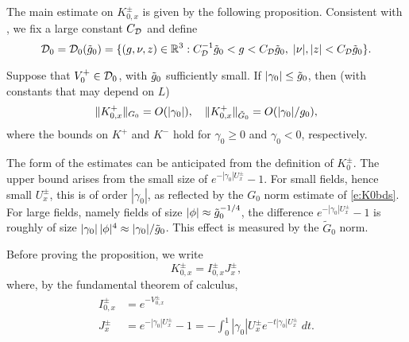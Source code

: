 
The main estimate on $K^\pm_{0,x}$ is given by the following proposition.
Consistent with \cite[\eqref{IE-e:DV1-bis}]{BS-rg-IE}, we
fix a large constant $C_{\mathcal{D}}$ and define
\begin{equation}
\label{e:DV0}
    \mathcal{D}_0 = \mathcal{D}_0(\tilde{g}_0) = \{(g,\nu,z) \in {\mathbb R}^3 : C_{\mathcal{D}}^{-1}\tilde{g}_0 < g < C_{\mathcal{D}}\tilde{g}_0,
    \; |\nu|,|z| < C_{\mathcal{D}}\tilde{g}_0\}.
\end{equation}

\begin{prop}
\label{prop:K0bd}
Suppose that $V^+_0 \in \mathcal{D}_0$, with $\tilde{g}_0$ sufficiently small.
If $|\gamma_0| \leq  \tilde{g}_0$, then
(with constants that may depend on $L$)
\begin{equation}
\lbeq{K0bds}
\|K^\pm_{0,x}\|_{G_0} = O(|\gamma_0|),
\quad
\|K^\pm_{0,x}\|_{\tilde G_0} = O(|\gamma_0|/g_0),
\end{equation}
where the bounds on $K^+$ and $K^-$ hold for $\gamma_0 \geq 0$
and $\gamma_0 < 0$, respectively.
\end{prop}


The form of the estimates  can be anticipated from the definition of
$K_0^\pm$.
The upper bound arises from the small size of
$e^{-|\gamma_0|U_x^\pm}-1$.  For small fields, hence small $U_x^\pm$, this is of order $|\gamma_0|$,
as reflected by the $G_0$ norm estimate of \eqref{e:K0bds}.
For large fields, namely fields of size $|\phi| \approx \tilde{g}_{0}^{-1/4}$, the difference
$e^{-|\gamma_0|U_x^\pm}-1$ is roughly of size $|\gamma_0|\,|\phi|^4 \approx |\gamma_0|/\tilde{g}_0$.
This effect is measured by the $\tilde G_0$ norm.

Before proving the proposition, we
write
\begin{equation}
K^\pm_{0,x} = I^\pm_{0,x} J^\pm_x
  \label{e:KIJ},
\end{equation}
where, by the fundamental theorem of calculus,
\begin{align}
    I^\pm_{0,x} &= e^{-V^\pm_{0,x}} \\
    J^\pm_x
    &= e^{-|\gamma_0|U^\pm_x} - 1
    = - \int_0^{1} |\gamma_0| U^\pm_x e^{-t |\gamma_0| U^\pm_x} \; dt.
\label{e:J}
\end{align}

